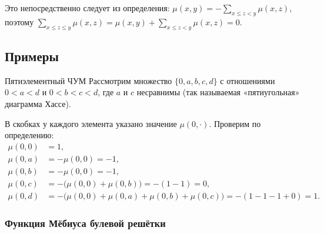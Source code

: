 Это непосредственно следует из определения: $\mu(x,y) = -\!\sum_{x \leq z < y}\mu(x,z)$,
поэтому $\sum_{x \leq z \leq y}\mu(x,z) = \mu(x,y) + \sum_{x \leq z < y}\mu(x,z) = 0$.

\subsection{Примеры}

\begin{Example}{Пятиэлементный ЧУМ}{}
	Рассмотрим множество $\{0, a, b, c, d\}$ с отношениями
	$0 < a < d$ и $0 < b < c < d$, где $a$ и $c$ несравнимы
	(так называемая «пятиугольная» диаграмма Хассе).
	
	\begin{center}
	\end{center}
	
	В скобках у каждого элемента указано значение $\mu(0,\cdot)$.
	Проверим по определению:
	\begin{align*}
		\mu(0,0) &= 1,\\
		\mu(0,a) &= -\mu(0,0) = -1,\\
		\mu(0,b) &= -\mu(0,0) = -1,\\
		\mu(0,c) &= -\bigl(\mu(0,0)+\mu(0,b)\bigr) = -(1 - 1) = 0,\\
		\mu(0,d) &= -\bigl(\mu(0,0)+\mu(0,a)+\mu(0,b)+\mu(0,c)\bigr)
		= -(1 - 1 - 1 + 0) = 1.
	\end{align*}
\end{Example}

\subsubsection*{Функция Мёбиуса булевой решётки}

